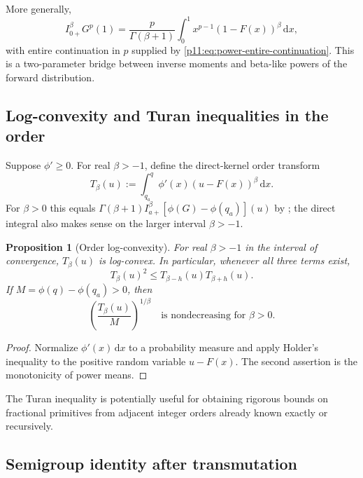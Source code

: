 \documentclass[11pt,oneside]{article}
\newtheorem{proposition}[theorem]{Proposition}
\theoremstyle{definition}
\theoremstyle{remark}
\newcommand{\dd}{\,\mathrm d}
\newcommand{\1}{\mathbf 1}
\begin{document}
More generally,
\begin{equation}
 I_{0+}^{\beta}G^p(1)
 =\frac{p}{\Gamma(\beta+1)}
  \int_0^1x^{p-1}(1-F(x))^\beta\dd x,
 \label{p11:eq:definite-power-general}
\end{equation}
with entire continuation in $p$ supplied by
\eqref{p11:eq:power-entire-continuation}.  This is a two-parameter bridge between
inverse moments and beta-like powers of the forward distribution.

\subsection{Log-convexity and Turan inequalities in the order}

Suppose $\phi'\ge0$.  For real $\beta>-1$, define the direct-kernel
order transform
\begin{equation}
 T_\beta(u)
 :=\int_{q_a}^{q}\phi'(x)(u-F(x))^\beta\dd x.
 \label{p11:eq:T-beta-def}
\end{equation}
For $\beta>0$ this equals
$\Gamma(\beta+1)I_{a+}^{\beta}[\phi(G)-\phi(q_a)](u)$ by
; the direct integral also makes sense on
the larger interval $\beta>-1$.

\begin{proposition}[Order log-convexity]
For real $\beta>-1$ in the interval of convergence, $T_\beta(u)$ is
log-convex.  In particular, whenever all three terms exist,
\begin{equation}
 T_\beta(u)^2\le T_{\beta-h}(u)T_{\beta+h}(u).
 \label{p11:eq:Turan-order}
\end{equation}
If $M=\phi(q)-\phi(q_a)>0$, then
\begin{equation}
 \left(\frac{T_\beta(u)}{M}\right)^{1/\beta}
 \quad\text{is nondecreasing for }\beta>0.
 \label{p11:eq:power-mean-order}
\end{equation}
\end{proposition}

\begin{proof}
Normalize $\phi'(x)\dd x$ to a probability measure and apply Holder's
inequality to the positive random variable $u-F(x)$.  The second assertion
is the monotonicity of power means.
\end{proof}

The Turan inequality is potentially useful for obtaining rigorous bounds on
fractional primitives from adjacent integer orders already known exactly or
recursively.

\subsection{Semigroup identity after transmutation}
\end{document}
